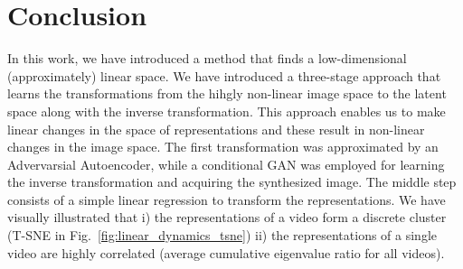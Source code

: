 \documentclass[10pt,twocolumn,letterpaper]{article}
\begin{document}
\section{Conclusion}\label{sec:linear_dynamics_conclusion}

In this work, we have introduced a method that finds a low-dimensional (approximately) linear space. We have introduced a three-stage approach that learns the transformations from the hihgly non-linear image space to the latent space along with the inverse transformation. This approach enables us to make linear changes in the space of representations and these result in non-linear changes in the image space. The first transformation was approximated by an Advervarsial Autoencoder, while a conditional GAN was employed for learning the inverse transformation and acquiring the synthesized image. The middle step consists of a simple linear regression to transform the representations. We have visually illustrated that i) the representations of a video form a discrete cluster (T-SNE in Fig.~\ref{fig:linear_dynamics_tsne})  ii) the representations of a single video are highly correlated (average cumulative eigenvalue ratio for all videos). 






{\small


}
\end{document}
